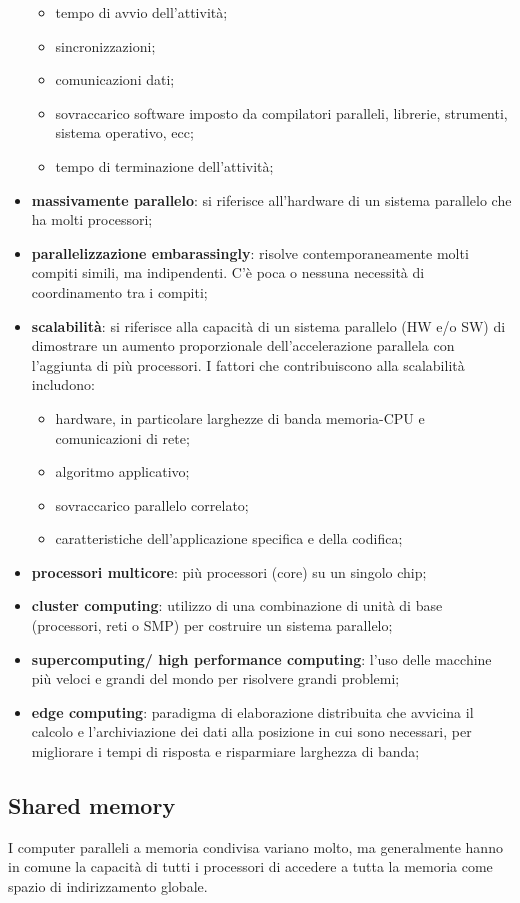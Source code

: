 \begin{itemize}
	\begin{itemize}
		\item tempo di avvio dell'attività;
		\item sincronizzazioni;
		\item comunicazioni dati;
		\item sovraccarico software imposto da compilatori paralleli, librerie,
		strumenti, sistema operativo, ecc;
		\item tempo di terminazione dell'attività;
	\end{itemize}
	\item \textbf{massivamente parallelo}: si riferisce all'hardware di un sistema parallelo che ha molti processori;
	\item \textbf{parallelizzazione embarassingly}: risolve contemporaneamente molti compiti simili, ma indipendenti. C'è poca o nessuna necessità di coordinamento tra i compiti;
	\item \textbf{scalabilità}: si riferisce alla capacità di un sistema parallelo (HW e/o SW)
	di dimostrare un aumento proporzionale dell'accelerazione parallela
	con l'aggiunta di più processori. I fattori che contribuiscono alla
	scalabilità includono:
	\begin{itemize}
		\item hardware, in particolare larghezze di banda memoria-CPU e comunicazioni di rete;
		\item algoritmo applicativo;
		\item sovraccarico parallelo correlato;
		\item caratteristiche dell'applicazione specifica e della codifica;
	\end{itemize}
	\item \textbf{processori multicore}: più processori (core) su un singolo
	chip;
	\item \textbf{cluster computing}: utilizzo di una combinazione di unità di base
	(processori, reti o SMP) per costruire un sistema parallelo;
	\item \textbf{supercomputing/ high performance computing}: l'uso delle macchine più veloci e grandi del mondo per risolvere grandi problemi;
	\item \textbf{edge computing}: paradigma di elaborazione distribuita che avvicina il calcolo e l'archiviazione dei dati alla posizione in cui sono necessari, per migliorare i tempi di risposta e risparmiare larghezza di banda;
\end{itemize}

\subsection{Shared memory}I computer paralleli a memoria condivisa variano molto, ma generalmente hanno in comune
la capacità di tutti i processori di accedere a tutta la memoria come spazio di indirizzamento globale.



